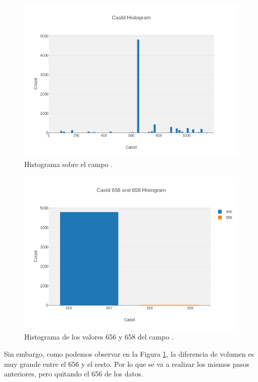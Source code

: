 \begin{figure}[!th]
\includegraphics[scale=0.5]{figures/histogram-casid-basic}
\centering
\caption{Histograma sobre el campo .}
\label{fig:histogram-casid-basic}
\end{figure}

\begin{figure}[!th]
\includegraphics[scale=0.5]{figures/histogram-casid-656-658}
\centering
\caption{Histograma de los valores 656 y 658 del campo .}
\label{fig:histogram-casid-656-658}
\end{figure}


Sin embargo, como podemos observar en la Figura \ref{fig:histogram-casid-basic}, la diferencia de volumen es muy grande entre el  656 y el resto. Por lo que se va a realizar los mismos pasos anteriores, pero quitando el  656 de los datos. \\

